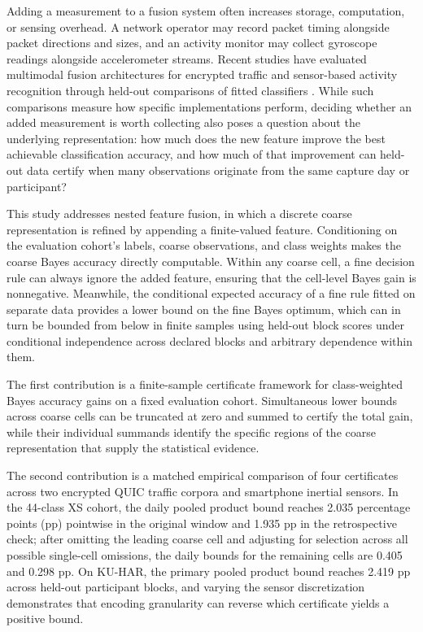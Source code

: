 \documentclass[preprint,11pt]{elsarticle}
\begin{document}
Adding a measurement to a fusion system often increases storage, computation, or sensing overhead. A network operator may record packet timing alongside packet directions and sizes, and an activity monitor may collect gyroscope readings alongside accelerometer streams. Recent studies have evaluated multimodal fusion architectures for encrypted traffic and sensor-based activity recognition through held-out comparisons of fitted classifiers \cite{zuo2026trafficcross,huang2027m2anet,oh2024lifelog}. While such comparisons measure how specific implementations perform, deciding whether an added measurement is worth collecting also poses a question about the underlying representation: how much does the new feature improve the best achievable classification accuracy, and how much of that improvement can held-out data certify when many observations originate from the same capture day or participant?

This study addresses nested feature fusion, in which a discrete coarse representation is refined by appending a finite-valued feature. Conditioning on the evaluation cohort's labels, coarse observations, and class weights makes the coarse Bayes accuracy directly computable. Within any coarse cell, a fine decision rule can always ignore the added feature, ensuring that the cell-level Bayes gain is nonnegative. Meanwhile, the conditional expected accuracy of a fine rule fitted on separate data provides a lower bound on the fine Bayes optimum, which can in turn be bounded from below in finite samples using held-out block scores under conditional independence across declared blocks and arbitrary dependence within them.

The first contribution is a finite-sample certificate framework for class-weighted Bayes accuracy gains on a fixed evaluation cohort. Simultaneous lower bounds across coarse cells can be truncated at zero and summed to certify the total gain, while their individual summands identify the specific regions of the coarse representation that supply the statistical evidence.

The second contribution is a matched empirical comparison of four certificates across two encrypted QUIC traffic corpora and smartphone inertial sensors. In the 44-class XS cohort, the daily pooled product bound reaches 2.035 percentage points (pp) pointwise in the original window and 1.935 pp in the retrospective check; after omitting the leading coarse cell and adjusting for selection across all possible single-cell omissions, the daily bounds for the remaining cells are 0.405 and 0.298 pp. On KU-HAR, the primary pooled product bound reaches 2.419 pp across held-out participant blocks, and varying the sensor discretization demonstrates that encoding granularity can reverse which certificate yields a positive bound.
\end{document}

